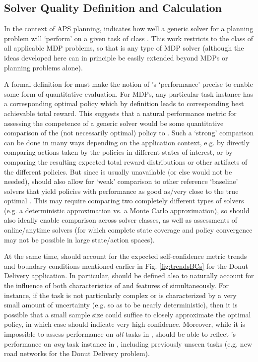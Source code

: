 \subsection{Solver Quality Definition and Calculation} \label{sec:xQ}
In the context of APS planning, \xQ{} indicates how well a generic solver \solve{} for a planning problem will `perform' on a given task \task{} of class \taskclass{}. This work restricts \taskclass{} to the class of all applicable MDP problems, so that \solve{} is any type of MDP solver  (although the ideas developed here can in principle be easily extended beyond MDPs or planning problems alone).

A formal definition for \xQ{} must make the notion of \solve{}'s `performance' precise to enable some form of quantitative evaluation. For MDPs, any particular task instance \task{} has a corresponding optimal policy \piopt{} which by definition leads to corresponding best achievable total reward. This suggests that a natural performance metric for assessing the competence of a generic solver \solve{} would be some quantitative comparison of the (not necessarily optimal) policy \pigeneric{} to \piopt. Such a `strong' comparison can be done in many ways depending on the application context, e.g. by directly comparing actions taken by the policies in different states of interest, or by comparing the resulting expected total reward distributions or other artifacts of the different policies. 
But since \piopt{} is usually unavailable (or else \solve{} would not be needed), \xQ{} should also allow for `weak' comparison to other reference `baseline' solvers that yield policies with performance as good as/very close to the true optimal \piopt. This may require comparing two completely different types of solvers (e.g. a deterministic approximation vs. a Monte Carlo approximation), so \xQ{} should also ideally enable comparison across solver classes, as well as assessments of online/anytime solvers (for which complete state coverage and policy convergence may not be possible in large state/action spaces).
 
At the same time, \xQ{} should account for the expected self-confidence metric trends and boundary conditions mentioned earlier in Fig. \ref{fig:trendsBCs} for the Donut Delivery application. In particular, \xQ{} should be defined also to naturally account for the influence of both characteristics of \solve{} and features of \task{} simultaneously. For instance, if the task \task{} is not particularly complex or is characterized by a very small amount of uncertainty (e.g. so as to be nearly deterministic), then it is possible that  a small sample size could suffice to closely approximate the optimal policy, in which case \xQ{} should indicate very high confidence. Moreover, while it is impossible to assess performance on \emph{all} tasks in \taskclass{}, \xQ{} should be able to reflect \solve{}'s performance on \emph{any} task instance \task{} in \taskclass{}, including previously unseen tasks (e.g. new road networks for the Donut Delivery problem). 

